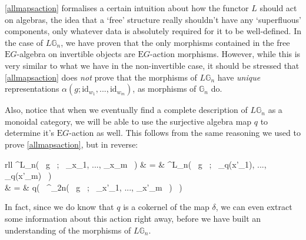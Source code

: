 \cref{allmapsaction} formalises a certain intuition about how the functor $L$ should act on algebras, the idea that a `free' structure really shouldn't have any `superfluous' components, only whatever data is absolutely required for it to be well-defined. In the case of $L\mathbb{G}_n$, we have proven that the only morphisms contained in the free $\mathrm{E}G$-algebra on invertible objects are $\mathrm{E}G$-action morphisms. However, while this is very similar to what we have in the non-invertible case, it should be stressed that \cref{allmapsaction} does \emph{not} prove that the morphisms of $L\mathbb{G}_n$ have \emph{unique} representations $\alpha(g; \mathrm{id}_{w_1}, ..., \mathrm{id}_{w_m})$, as morphisms of $\mathbb{G}_n$ do.

Also, notice that when we eventually find a complete description of $L\mathbb{G}_n$ as a monoidal category, we will be able to use the surjective algebra map $q$ to determine it's $\mathrm{E}G$-action as well. This follows from the same reasoning we used to prove \cref{allmapsaction}, but in reverse:
\begin{eq*}\begin{array}{rll}
			\alpha^{L_n}( \, g \, ; \, _{x_1}, ..., _{x_m} \, ) & = & \alpha^{L_n}( \, g \, ; \, _{q(x'_1)}, ..., _{q(x'_m)} \, ) \\
			& = & q\big( \, \alpha^{_{2n}}( \, g \, ; \, _{x'_1}, ..., _{x'_m} \, ) \, \big)
		\end{array}
\end{eq*}
In fact, since we do know that $q$ is a cokernel of the map $\delta$, we can even extract some information about this action right away, before we have built an understanding of the morphisms of $L\mathbb{G}_n$.

